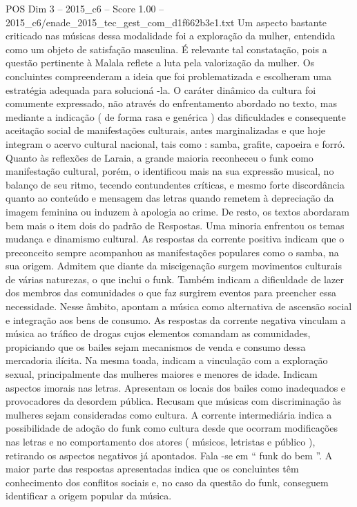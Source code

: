 \begin{textsample}{POS Dim 3 – 2015\_c6 – Score 1.00 – 2015\_c6/enade\_2015\_tec\_gest\_com\_d1f662b3e1.txt}
Um aspecto bastante criticado nas músicas dessa modalidade foi a exploração da mulher, entendida como um objeto de satisfação masculina.
É relevante tal constatação, pois a questão pertinente à Malala reflete a luta pela valorização da mulher.
Os concluintes compreenderam a ideia que foi problematizada e escolheram uma estratégia adequada para solucioná -la.
O caráter dinâmico da cultura foi comumente expressado, não através do enfrentamento abordado no texto, mas mediante a indicação ( de forma rasa e genérica ) das dificuldades e consequente aceitação social de manifestações culturais, antes marginalizadas e que hoje integram o acervo cultural nacional, tais como : samba, grafite, capoeira e forró.
Quanto às reflexões de Laraia, a grande maioria reconheceu o funk como manifestação cultural, porém, o identificou mais na sua expressão musical, no balanço de seu ritmo, tecendo contundentes críticas, e mesmo forte discordância quanto ao conteúdo e mensagem das letras quando remetem à depreciação da imagem feminina ou induzem à apologia ao crime.
De resto, os textos abordaram bem mais o item dois do padrão de Respostas.
Uma minoria enfrentou os temas mudança e dinamismo cultural.
As respostas da corrente positiva indicam que o preconceito sempre acompanhou as manifestações populares como o samba, na sua origem.
Admitem que diante da miscigenação surgem movimentos culturais de várias naturezas, o que inclui o funk.
Também indicam a dificuldade de lazer dos membros das comunidades o que faz surgirem eventos para preencher essa necessidade.
Nesse âmbito, apontam a música como alternativa de ascensão social e integração aos bens de consumo.
As respostas da corrente negativa vinculam a música ao tráfico de drogas cujos elementos comandam as comunidades, propiciando que os bailes sejam mecanismos de venda e consumo dessa mercadoria ilícita.
Na mesma toada, indicam a vinculação com a exploração sexual, principalmente das mulheres maiores e menores de idade.
Indicam aspectos imorais nas letras.
Apresentam os locais dos bailes como inadequados e provocadores da desordem pública.
Recusam que músicas com discriminação às mulheres sejam consideradas como cultura.
A corrente intermediária indica a possibilidade de adoção do funk como cultura desde que ocorram modificações nas letras e no comportamento dos atores ( músicos, letristas e público ), retirando os aspectos negativos já apontados.
Fala -se em “ funk do bem ”.
A maior parte das respostas apresentadas indica que os concluintes têm conhecimento dos conflitos sociais e, no caso da questão do funk, conseguem identificar a origem popular da música.

\end{textsample}
